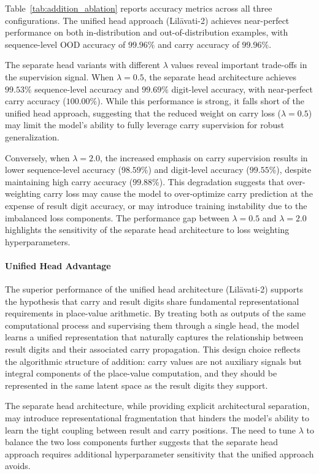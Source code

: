 Table~\ref{tab:addition_ablation} reports accuracy metrics across all three configurations. The unified head approach (Lil\={a}vati-2) achieves near-perfect performance on both in-distribution and out-of-distribution examples, with sequence-level OOD accuracy of $99.96\%$ and carry accuracy of $99.96\%$. 

The separate head variants with different $\lambda$ values reveal important trade-offs in the supervision signal. When $\lambda = 0.5$, the separate head architecture achieves $99.53\%$ sequence-level accuracy and $99.69\%$ digit-level accuracy, with near-perfect carry accuracy ($100.00\%$). While this performance is strong, it falls short of the unified head approach, suggesting that the reduced weight on carry loss ($\lambda = 0.5$) may limit the model's ability to fully leverage carry supervision for robust generalization.

Conversely, when $\lambda = 2.0$, the increased emphasis on carry supervision results in lower sequence-level accuracy ($98.59\%$) and digit-level accuracy ($99.55\%$), despite maintaining high carry accuracy ($99.88\%$). This degradation suggests that over-weighting carry loss may cause the model to over-optimize carry prediction at the expense of result digit accuracy, or may introduce training instability due to the imbalanced loss components. The performance gap between $\lambda = 0.5$ and $\lambda = 2.0$ highlights the sensitivity of the separate head architecture to loss weighting hyperparameters.

\paragraph{Unified Head Advantage}

The superior performance of the unified head architecture (Lil\={a}vati-2) supports the hypothesis that carry and result digits share fundamental representational requirements in place-value arithmetic. By treating both as outputs of the same computational process and supervising them through a single head, the model learns a unified representation that naturally captures the relationship between result digits and their associated carry propagation. This design choice reflects the algorithmic structure of addition: carry values are not auxiliary signals but integral components of the place-value computation, and they should be represented in the same latent space as the result digits they support.

The separate head architecture, while providing explicit architectural separation, may introduce representational fragmentation that hinders the model's ability to learn the tight coupling between result and carry positions. The need to tune $\lambda$ to balance the two loss components further suggests that the separate head approach requires additional hyperparameter sensitivity that the unified approach avoids.

